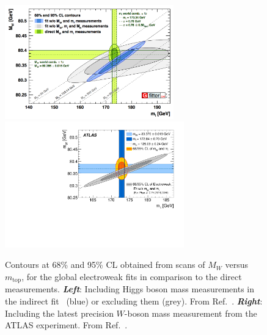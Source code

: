 \begin{figure}[!htb]
    \begin{center}
        \includegraphics[width=0.65\textwidth]{figures/chapter1/sm_final/mw_vs_mt_indirect}
        \includegraphics[width=0.69\textwidth]{figures/chapter1/sm_final/atlas_w_boson_mass_mw_mt}
        \caption{
            Contours at 68\% and 95\% CL obtained from scans of $M_W$ versus $m_{\text{top}}$,
            for the global electroweak fits in comparison to the direct measurements.
            \textit{\textbf{Left}}: Including Higgs boson mass measurements in the indirect fit~\cite{HMassATLAS,HMassCMS} (blue)
                or excluding them (grey). From Ref.~\cite{GFitter}.
            \textit{\textbf{Right}}: Including the latest precision $W$-boson mass measurement from the ATLAS
                experiment. From Ref.~\cite{ATLASWMass}.
        }
        \label{fig:mw_mt_scan}
    \end{center}
\end{figure}

